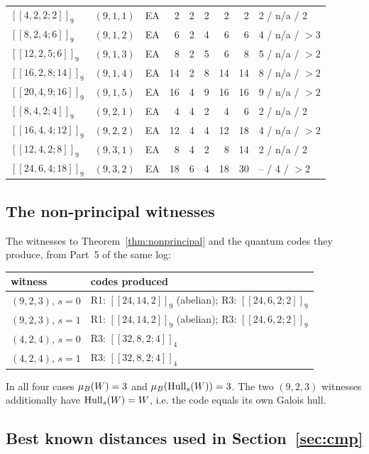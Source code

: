 \begin{table}[ht]
\begin{tabular}{@{}llcrrrrrl@{}}
$[[4,2,2;2]]_9$  & $(9,1,1)$ & EA & 2  & 2  & 2  & 2  & 2  & 2 / n/a / 2\\
$[[8,2,4;6]]_9$  & $(9,1,2)$ & EA & 6  & 2  & 4  & 6  & 6  & 4 / n/a / $>3$\\
$[[12,2,5;6]]_9$ & $(9,1,3)$ & EA & 8  & 2  & 5  & 6  & 8  & 5 / n/a / $>2$\\
$[[16,2,8;14]]_9$ & $(9,1,4)$ & EA & 14 & 2  & 8  & 14 & 14 & 8 / n/a / $>2$\\
$[[20,4,9;16]]_9$ & $(9,1,5)$ & EA & 16 & 4  & 9  & 16 & 16 & 9 / n/a / $>2$\\
$[[8,4,2;4]]_9$  & $(9,2,1)$ & EA & 4  & 4  & 2  & 4  & 6  & 2 / n/a / 2\\
$[[16,4,4;12]]_9$ & $(9,2,2)$ & EA & 12 & 4  & 4  & 12 & 18 & 4 / n/a / $>2$\\
$[[12,4,2;8]]_9$ & $(9,3,1)$ & EA & 8  & 4  & 2  & 8  & 14 & 2 / n/a / 2\\
$[[24,6,4;18]]_9$ & $(9,3,2)$ & EA & 18 & 6  & 4  & 18 & 30 & -- / 4 / $>2$\\
\bottomrule
\end{tabular}
\end{table}

\subsection{The non-principal witnesses}

The witnesses to Theorem~\ref{thm:nonprincipal} and the quantum codes they
produce, from Part~5 of the same log:

\begin{center}
\begin{tabular}{@{}ll@{}}
\toprule
witness & codes produced\\\midrule
$(9,2,3)$, $s=0$ & R1: $[[24,14,2]]_9$ (abelian); R3: $[[24,6,2;2]]_9$\\
$(9,2,3)$, $s=1$ & R1: $[[24,14,2]]_9$ (abelian); R3: $[[24,6,2;2]]_9$\\
$(4,2,4)$, $s=0$ & R3: $[[32,8,2;4]]_4$\\
$(4,2,4)$, $s=1$ & R3: $[[32,8,2;4]]_4$\\
\bottomrule
\end{tabular}
\end{center}

In all four cases $\mu_{B}(W)=3$ and $\mu_{B}(\operatorname{Hull}_s(W))=3$. The two
$(9,2,3)$ witnesses additionally have $\operatorname{Hull}_s(W)=W$, i.e. the code equals its
own Galois hull.

\subsection{Best known distances used in Section~\ref{sec:cmp}}

